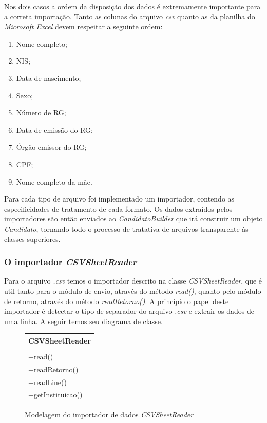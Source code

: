 \documentclass[
	12pt,			%
	openright,		%
	oneside,	
	a4paper,		%
	english,		%
	brazil			%
]{abntex2/abntex2}  %
\begin{document}
	Nos dois casos a ordem da disposição dos dados é extremamente importante para a correta importação. Tanto as colunas do arquivo \textit{csv} quanto as da planilha do \textit{Microsoft Excel} devem respeitar a seguinte ordem:
	
	\begin{enumerate}
		
		\item Nome completo;
		\item NIS;
		\item Data de nascimento;
		\item Sexo;
		\item Número de RG;
		\item Data de emissão do RG;
		\item Órgão emissor do RG;
		\item CPF;
		\item Nome completo da mãe.
		
	\end{enumerate}
	
	Para cada tipo de arquivo foi implementado um importador, contendo as especificidades de tratamento de cada formato. Os dados extraídos pelos importadores são então enviados ao \textit{CandidatoBuilder} que irá construir um objeto \textit{Candidato}, tornando todo o processo de tratativa de arquivos transparente às classes superiores.
	
	\subsubsection{O importador \textit{CSVSheetReader}}
	
	Para o arquivo \textit{.csv} temos o importador descrito na classe \textit{CSVSheetReader}, que é util tanto para o módulo de envio, através do método \textit{read()}, quanto pelo módulo de retorno, através do método \textit{readRetorno()}. A princípio o papel deste importador é detectar o tipo de separador do arquivo \textit{.csv} e extrair os dados de uma linha. A seguir temos seu diagrama de classe.
	
	\begin{figure}[H]
		\begin{center}
			
			\caption{Modelagem do importador de dados \textit{CSVSheetReader}}
			\label{csvreader-uml}
			
			\begin{tabular}{|l|}
				\hline
				\multicolumn{1}{|c|}{\textbf{CSVSheetReader}} \\ \hline
				\\ \hline
				+read() \\
				+readRetorno() \\
				+readLine() \\
				+getInstituicao() \\ \hline
			\end{tabular}
			
		\end{center}
	\end{figure}
	
\end{document}
